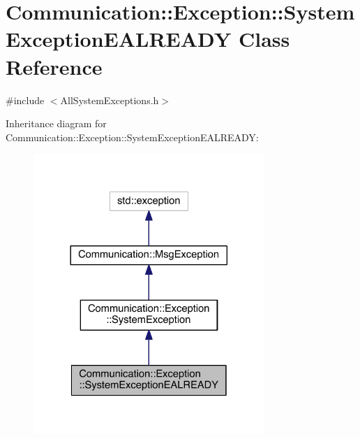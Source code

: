 \hypertarget{class_communication_1_1_exception_1_1_system_exception_e_a_l_r_e_a_d_y}{}\section{Communication\+:\+:Exception\+:\+:System\+Exception\+E\+A\+L\+R\+E\+A\+D\+Y Class Reference}
\label{class_communication_1_1_exception_1_1_system_exception_e_a_l_r_e_a_d_y}


{\ttfamily \#include $<$All\+System\+Exceptions.\+h$>$}



Inheritance diagram for Communication\+:\+:Exception\+:\+:System\+Exception\+E\+A\+L\+R\+E\+A\+D\+Y\+:\nopagebreak
\begin{figure}[H]
\begin{center}
\leavevmode
\includegraphics[width=248pt]{class_communication_1_1_exception_1_1_system_exception_e_a_l_r_e_a_d_y__inherit__graph}
\end{center}
\end{figure}


